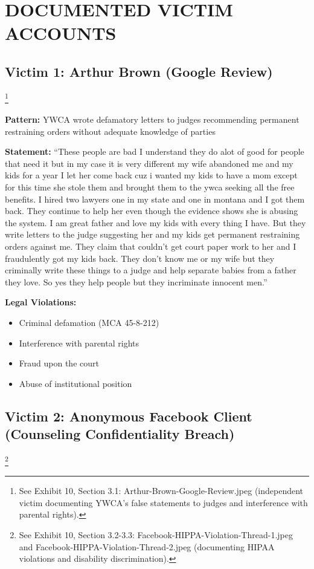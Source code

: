 \documentclass[12pt,oneside]{article}
\begin{document}
\section*{DOCUMENTED VICTIM ACCOUNTS}

\subsection*{Victim 1: Arthur Brown (Google Review)}\footnote{See Exhibit 10, Section 3.1: Arthur-Brown-Google-Review.jpeg (independent victim documenting YWCA's false statements to judges and interference with parental rights).}

\textbf{Pattern:} YWCA wrote defamatory letters to judges recommending permanent restraining orders without adequate knowledge of parties

\textbf{Statement:} ``These people are bad I understand they do alot of good for people that need it but in my case it is very different my wife abandoned me and my kids for a year I let her come back cuz i wanted my kids to have a mom except for this time she stole them and brought them to the ywca seeking all the free benefits. I hired two lawyers one in my state and one in montana and I got them back. They continue to help her even though the evidence shows she is abusing the system. I am great father and love my kids with every thing I have. But they write letters to the judge suggesting her and my kids get permanent restraining orders against me. They claim that couldn't get court paper work to her and I fraudulently got my kids back. They don't know me or my wife but they criminally write these things to a judge and help separate babies from a father they love. So yes they help people but they incriminate innocent men.''

\textbf{Legal Violations:}
\begin{itemize}
\item Criminal defamation (MCA 45-8-212)
\item Interference with parental rights
\item Fraud upon the court
\item Abuse of institutional position
\end{itemize}

\subsection*{Victim 2: Anonymous Facebook Client (Counseling Confidentiality Breach)}\footnote{See Exhibit 10, Section 3.2-3.3: Facebook-HIPPA-Violation-Thread-1.jpeg and Facebook-HIPPA-Violation-Thread-2.jpeg (documenting HIPAA violations and disability discrimination).}
\end{document}
